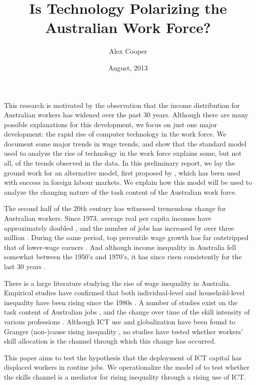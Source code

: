 \documentclass[a4paper,11pt]{article}
\title{Is Technology Polarizing the Australian Work Force?}
\author{Alex Cooper}
\date{August, 2013}
\begin{document}
\maketitle

This research is motivated by the observation that the income distribution for Australian workers has widened over the past 30 years. Although there are many possible explanations for this development, we focus on just one major development: the rapid rise of computer technology in the work force. We document some major trends in wage trends, and show that the standard model used to analyze the rise of technology in the work force explains some, but not all, of the trends observed in the data. In this preliminary report, we lay the ground work for an alternative model, first proposed by \citet{Levy2003}, which has been used with success in foreign labour markets. We explain how this model will be used to analyze the changing nature of the task content of the Australian work force.

The second half of the 20th century has witnessed tremendous change for Australian workers. Since 1973, average real per capita incomes have approximately doubled \citep{NA20124}, and the number of jobs has increased by over three million \citep{LFSApr2013}. During the same period, top percentile wage growth has far outstripped that of lower-wage earners \citep{Atkinson1997,Borland1999}. And although income inequality in Australia fell somewhat between the 1950's and 1970's, it has since risen consistently for the last 30 years \citep{Leigh2005,Gaston2009}.

There is a large literature studying the rise of wage inequality in Australia. Empirical studies have confirmed that both individual-level and household-level inequality have been rising since the 1980s \citep{Borland1999,Leigh2005,Gaston2009}. A number of studies exist on the task content of Australian jobs \citep{Esposto2012a}, and the change over time of the skill intensity of various professions \citep{Esposto2012, Esposto2012a}. Although ICT use and globalization have been found to Granger (non-)cause rising inequality \citep{Gaston2009}, no studies have tested whether workers' skill allocation is the channel through which this change has occurred.

This paper aims to test the hypothesis that the deployment of ICT capital has displaced workers in routine jobs. We operationalize the model of \citep{Acemoglu2011} to test whether the skills channel is a mediator for rising inequality through a rising use of ICT.
\end{document}
